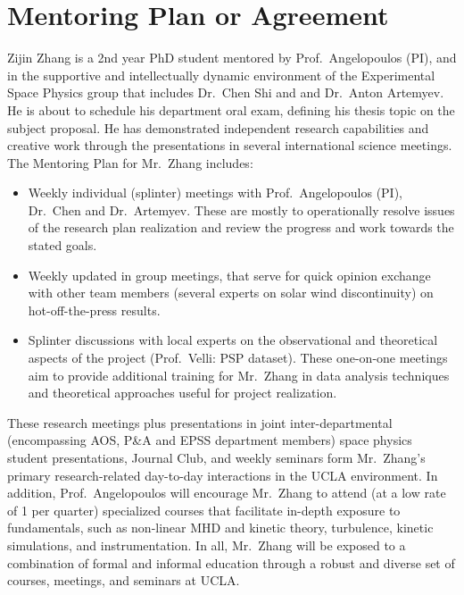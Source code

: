 \documentclass[
  letterpaper,
  DIV=11,
  numbers=noendperiod]{scrartcl}
\providecommand{\tightlist}{%
  \setlength{\itemsep}{0pt}\setlength{\parskip}{0pt}}\usepackage{longtable,booktabs,array}
\begin{document}
\section{Mentoring Plan or Agreement}\label{mentoring-plan-or-agreement}

Zijin Zhang is a 2nd year PhD student mentored by Prof.~Angelopoulos
(PI), and in the supportive and intellectually dynamic environment of
the Experimental Space Physics group that includes Dr.~Chen Shi and and
Dr.~Anton Artemyev. He is about to schedule his department oral exam,
defining his thesis topic on the subject proposal. He has demonstrated
independent research capabilities and creative work through the
presentations in several international science meetings. The Mentoring
Plan for Mr.~Zhang includes:

\begin{itemize}
\tightlist
\item
  Weekly individual (splinter) meetings with Prof.~Angelopoulos (PI),
  Dr.~Chen and Dr.~Artemyev. These are mostly to operationally resolve
  issues of the research plan realization and review the progress and
  work towards the stated goals.
\item
  Weekly updated in group meetings, that serve for quick opinion
  exchange with other team members (several experts on solar wind
  discontinuity) on hot-off-the-press results.
\item
  Splinter discussions with local experts on the observational and
  theoretical aspects of the project (Prof.~Velli: PSP dataset). These
  one-on-one meetings aim to provide additional training for Mr.~Zhang
  in data analysis techniques and theoretical approaches useful for
  project realization.
\end{itemize}

These research meetings plus presentations in joint inter-departmental
(encompassing AOS, P\&A and EPSS department members) space physics
student presentations, Journal Club, and weekly seminars form
Mr.~Zhang's primary research-related day-to-day interactions in the UCLA
environment. In addition, Prof.~Angelopoulos will encourage Mr.~Zhang to
attend (at a low rate of 1 per quarter) specialized courses that
facilitate in-depth exposure to fundamentals, such as non-linear MHD and
kinetic theory, turbulence, kinetic simulations, and instrumentation. In
all, Mr.~Zhang will be exposed to a combination of formal and informal
education through a robust and diverse set of courses, meetings, and
seminars at UCLA.
\end{document}

